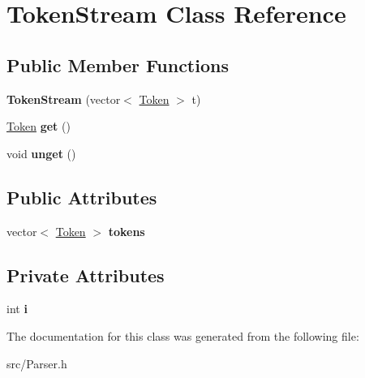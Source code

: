 \hypertarget{class_token_stream}{\section{Token\-Stream Class Reference}
\label{class_token_stream}
}
\subsection*{Public Member Functions}
\begin{DoxyCompactItemize}
\item 
\hypertarget{class_token_stream_adf083c4f320b509b3731c9a80d11d604}{{\bfseries Token\-Stream} (vector$<$ \hyperlink{struct_token}{Token} $>$ t)}\label{class_token_stream_adf083c4f320b509b3731c9a80d11d604}

\item 
\hypertarget{class_token_stream_ab54e9e22c60d1ae65af7bb707cd1afac}{\hyperlink{struct_token}{Token} {\bfseries get} ()}\label{class_token_stream_ab54e9e22c60d1ae65af7bb707cd1afac}

\item 
\hypertarget{class_token_stream_a8217fb6decbb196947f7f9f2ed38eaf6}{void {\bfseries unget} ()}\label{class_token_stream_a8217fb6decbb196947f7f9f2ed38eaf6}

\end{DoxyCompactItemize}
\subsection*{Public Attributes}
\begin{DoxyCompactItemize}
\item 
\hypertarget{class_token_stream_a4eeaae50cddfc0e5774a68145dec3299}{vector$<$ \hyperlink{struct_token}{Token} $>$ {\bfseries tokens}}\label{class_token_stream_a4eeaae50cddfc0e5774a68145dec3299}

\end{DoxyCompactItemize}
\subsection*{Private Attributes}
\begin{DoxyCompactItemize}
\item 
\hypertarget{class_token_stream_aab11b13f9e91d978d181ef0f8c7b25d7}{int {\bfseries i}}\label{class_token_stream_aab11b13f9e91d978d181ef0f8c7b25d7}

\end{DoxyCompactItemize}


The documentation for this class was generated from the following file\-:\begin{DoxyCompactItemize}
\item 
src/Parser.\-h\end{DoxyCompactItemize}
